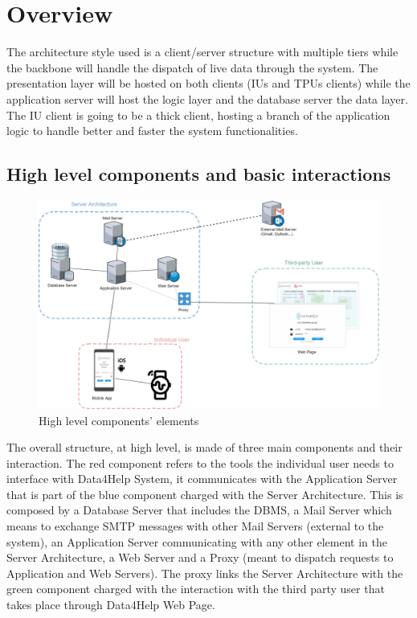 \section{Overview}
The architecture style used is a client/server structure with multiple tiers while the backbone will handle the dispatch of live data through the system. The presentation layer will be hosted on both clients (IUs and TPUs clients) while the application server will host the logic layer and the database server the data layer. The IU client is going to be a thick client, hosting a branch of the application logic to handle better and faster the system functionalities.
\subsection{High level components and basic interactions}
\begin{figure}[H]
\caption{High level components' elements}
\includegraphics[width = \textwidth]{sections/architecturalDesign/overview_1.jpg}
\end{figure}

The overall structure, at high level, is made of three main components and their interaction. 
The red component refers to the tools the individual user needs to interface with Data4Help System, it communicates with the Application Server that is part of the blue component charged with the Server Architecture. This is composed by a Database Server that includes the DBMS, a Mail Server which means to exchange SMTP messages with other Mail Servers (external to the system), an Application Server communicating with any other element in the Server Architecture, a Web Server and a Proxy (meant to dispatch requests to Application and Web Servers). 
The proxy links the Server Architecture with the green component charged with the interaction with the third party user that takes place through Data4Help Web Page. 

